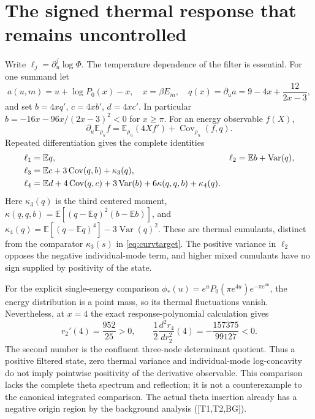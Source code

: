 \documentclass[11pt,letterpaper]{article}
\numberwithin{equation}{section}
\theoremstyle{remark}
\DeclareMathOperator{\Var}{Var}
\DeclareMathOperator{\Cov}{Cov}
\newcommand{\E}{\mathbb E}
\newcommand{\ev}[1]{\textsf{[#1]}}
\begin{document}
\section{The signed thermal response that remains uncontrolled}
\label{sec:residual}
Write $\ell_j=\partial_u^j\log\Phi$. The temperature dependence of the
filter is essential. For one summand let
\begin{equation}
 a(u,m)=u+\log P_0(x)-x,\quad x=\beta E_m,\quad
 q(x)=\partial_u a=9-4x+\frac{12}{2x-3},
\end{equation}
and set $b=4xq'$, $c=4xb'$, $d=4xc'$. In particular
$b=-16x-96x/(2x-3)^2<0$ for $x\ge\pi$.
For an energy observable $f(X)$,
\begin{equation}
 \partial_u\E_{\rho_u}f=\E_{\rho_u}(4Xf')+
                  \Cov_{\rho_u}(f,q). \label{eq:thermderivative}
\end{equation}
Repeated differentiation gives the complete identities
\begin{align}
 \ell_1&=\E q,&
 \ell_2&=\E b+\Var(q),\notag\\
 \ell_3&=\E c+3\Cov(q,b)+\kappa_3(q),\notag\\
 \ell_4&=\E d+4\Cov(q,c)+3\Var(b)
                 +6\kappa(q,q,b)+\kappa_4(q). \label{eq:cumulants}
\end{align}
Here $\kappa_3(q)$ is the third centered moment,
$\kappa(q,q,b)=\E[(q-\E q)^2(b-\E b)]$, and
$\kappa_4(q)=\E[(q-\E q)^4]-3\Var(q)^2$.
These are thermal cumulants, distinct from the comparator
$\kappa_3(s)$ in \eqref{eq:curvtarget}. The positive variance in
$\ell_2$ opposes the negative individual-mode term, and higher mixed
cumulants have no sign supplied by positivity of the state.

For the explicit single-energy comparison
$\phi_*(u)=e^uP_0(\pi e^{4u})e^{-\pi e^{4u}}$, the energy distribution
is a point mass, so its thermal fluctuations vanish. Nevertheless, at
$x=4$ the exact response-polynomial calculation gives
\begin{equation}
 r_2'(4)=\frac{952}{25}>0,\qquad
 \frac12\frac{d^2r_4}{dr_2^2}(4)
 =-\frac{157375}{99127}<0. \label{eq:thermalwitness}
\end{equation}
The second number is the confluent three-node determinant quotient.
Thus a positive filtered state, zero thermal variance and individual-mode
log-concavity do not imply pointwise positivity of the derivative
observable. This comparison lacks the complete theta spectrum and
reflection; it is not a counterexample to the canonical integrated
comparison. The actual theta insertion already has a negative origin
region by the background analysis (\ev{T1,T2,BG}).
\end{document}
